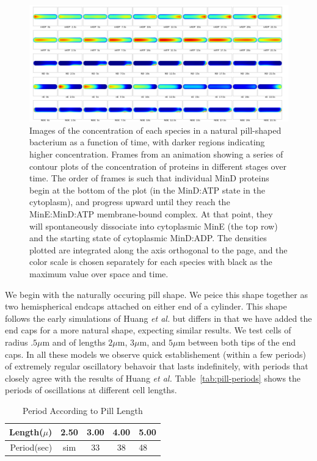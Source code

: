 \documentclass[letterpaper,twocolumn,amsmath,amssymb,pre]{revtex4-1}
\newcommand\micron{\ensuremath{\mu\text{m}}}
\begin{document}
\begin{figure}
  \includegraphics[width=\textwidth]{../data/shape-p/plots/image-plot--p-400-50-0-0-1500.pdf}
  \caption{Images of the concentration of each species in a natural
    pill-shaped bacterium as a function of time, with darker regions
    indicating higher concentration.  Frames from an animation showing
    a series of contour plots of the concentration of proteins in
    different stages over time.  The order of frames is such that
    individual MinD proteins begin at the bottom of the plot (in the
    MinD:ATP state in the cytoplasm), and progress upward until they
    reach the MinE:MinD:ATP membrane-bound complex.  At that point,
    they will spontaneously dissociate into cytoplasmic MinE (the top
    row) and the starting state of cytoplasmic MinD:ADP.  The
    densities plotted are integrated along the axis orthogonal to the
    page, and the color scale is chosen separately for each species
    with black as the maximum value over space and time.}
  \label{image-p}
\end{figure}

We begin with the naturally occuring pill shape.  We peice this shape
together as two hemispherical endcaps attached on either end of a
cylinder.  This shape follows the early simulations of Huang \emph{et
  al.} but differs in that we have added the end caps for a more
natural shape, expecting similar results.  We test cells of radius
$.5\micron$ and of lengths $2\micron$, $3\micron$, and $5\micron$
between both tips of the end caps. In all these models we observe
quick establishement (within a few periods) of extremely regular
oscillatory behavoir that lasts indefinitely, with periods that
closely agree with the results of Huang \emph{et al.}
Table~\ref{tab:pill-periods} shows the periods of oscillations
at different cell lengths.

\begin{table}
  \begin{tabular}{|r|c|c|c|l|}
    \hline
    Length($\mu$) & 2.50 & 3.00 & 4.00 & 5.00\\
    \hline
    Period(sec) & sim & 33 & 38 & 48 \\ \cline{2-2}
    \hline
  \end{tabular}
  \caption{Period According to Pill Length}\label{tab:pill-period}
\end{table}
\end{document}
